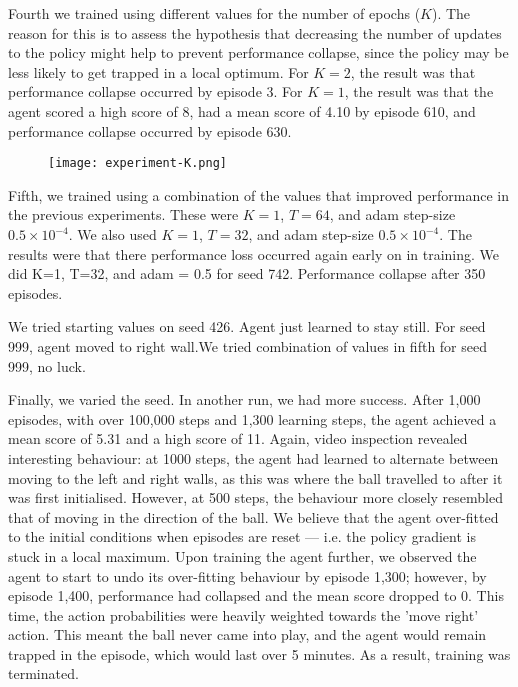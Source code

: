 \documentclass[12pt,a4paper]{article}
\begin{document}
Fourth we trained using different values for the number of epochs ($K$). The reason for this is to assess the hypothesis that decreasing the number of updates to the policy might help to prevent performance collapse, since the policy may be less likely to get trapped in a local optimum. For $K=2$, the result was that performance collapse occurred by episode 3. For $K=1$, the result was that the agent scored a high score of 8, had a mean score of 4.10 by episode 610, and performance collapse occurred by episode 630. 

\begin{figure}[ht]
    \centering
    \texttt{[image: experiment-K.png]}
\end{figure}

Fifth, we trained using a combination of the values that improved performance in the previous experiments. These were $K=1$, $T=64$, and adam step-size $0.5 \times 10^{-4}$. We also used $K=1$, $T=32$, and adam step-size $0.5 \times 10^{-4}$. The results were that there performance loss occurred again early on in training. We did K=1, T=32, and adam = 0.5 for seed 742. Performance collapse after 350 episodes.

We tried starting values on seed 426. Agent just learned to stay still. For seed 999, agent moved to right wall.We tried combination of values in fifth for seed 999, no luck.

Finally, we varied the seed. In another run, we had more success. After 1,000 episodes, with over 100,000 steps and 1,300 learning steps, the agent achieved a mean score of 5.31 and a high score of 11. Again, video inspection revealed interesting behaviour: at 1000 steps, the agent had learned to alternate between moving to the left and right walls, as this was where the ball travelled to after it was first initialised. However, at 500 steps, the behaviour more closely resembled that of moving in the direction of the ball. We believe that the agent over-fitted to the initial conditions when episodes are reset --- i.e. the policy gradient is stuck in a local maximum. Upon training the agent further, we observed the agent to start to undo its over-fitting behaviour by episode 1,300; however, by episode 1,400, performance had collapsed and the mean score dropped to 0. This time, the action probabilities were heavily weighted towards the 'move right' action. This meant the ball never came into play, and the agent would remain trapped in the episode, which would last over 5 minutes. As a result, training was terminated. 
\end{document}
